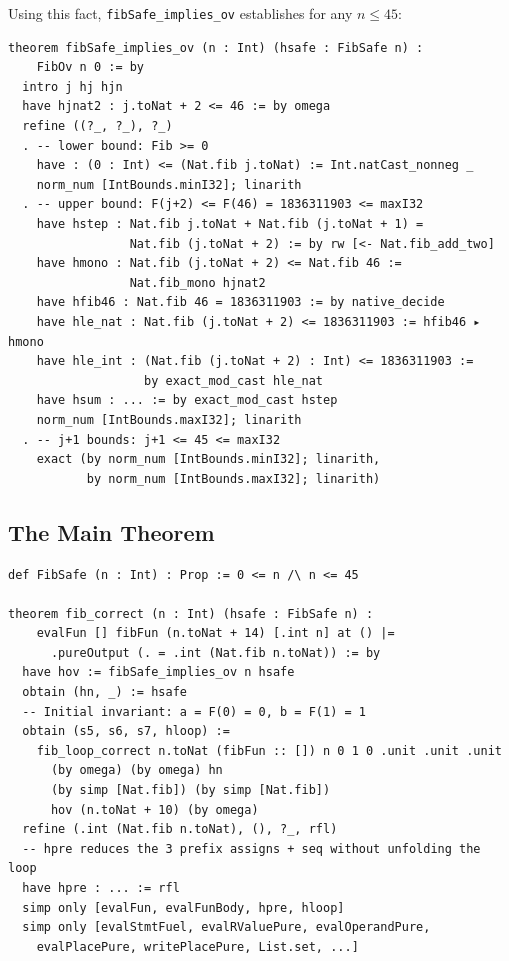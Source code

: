 Using this fact, \texttt{fibSafe\_implies\_ov} establishes \FibOv for any
$n \le 45$:

\begin{lstlisting}[caption={fibSafe\_implies\_ov proof structure.},label={lst:fibsafeov}]
theorem fibSafe_implies_ov (n : Int) (hsafe : FibSafe n) :
    FibOv n 0 := by
  intro j hj hjn
  have hjnat2 : j.toNat + 2 <= 46 := by omega
  refine ((?_, ?_), ?_)
  . -- lower bound: Fib >= 0
    have : (0 : Int) <= (Nat.fib j.toNat) := Int.natCast_nonneg _
    norm_num [IntBounds.minI32]; linarith
  . -- upper bound: F(j+2) <= F(46) = 1836311903 <= maxI32
    have hstep : Nat.fib j.toNat + Nat.fib (j.toNat + 1) =
                 Nat.fib (j.toNat + 2) := by rw [<- Nat.fib_add_two]
    have hmono : Nat.fib (j.toNat + 2) <= Nat.fib 46 :=
                 Nat.fib_mono hjnat2
    have hfib46 : Nat.fib 46 = 1836311903 := by native_decide
    have hle_nat : Nat.fib (j.toNat + 2) <= 1836311903 := hfib46 ▸ hmono
    have hle_int : (Nat.fib (j.toNat + 2) : Int) <= 1836311903 :=
                   by exact_mod_cast hle_nat
    have hsum : ... := by exact_mod_cast hstep
    norm_num [IntBounds.maxI32]; linarith
  . -- j+1 bounds: j+1 <= 45 <= maxI32
    exact (by norm_num [IntBounds.minI32]; linarith,
           by norm_num [IntBounds.maxI32]; linarith)
\end{lstlisting}

\subsection{The Main Theorem}

\begin{lstlisting}[caption={fib\_correct: the main theorem.},label={lst:fibcorrect}]
def FibSafe (n : Int) : Prop := 0 <= n /\ n <= 45

theorem fib_correct (n : Int) (hsafe : FibSafe n) :
    evalFun [] fibFun (n.toNat + 14) [.int n] at () |=
      .pureOutput (. = .int (Nat.fib n.toNat)) := by
  have hov := fibSafe_implies_ov n hsafe
  obtain (hn, _) := hsafe
  -- Initial invariant: a = F(0) = 0, b = F(1) = 1
  obtain (s5, s6, s7, hloop) :=
    fib_loop_correct n.toNat (fibFun :: []) n 0 1 0 .unit .unit .unit
      (by omega) (by omega) hn
      (by simp [Nat.fib]) (by simp [Nat.fib])
      hov (n.toNat + 10) (by omega)
  refine (.int (Nat.fib n.toNat), (), ?_, rfl)
  -- hpre reduces the 3 prefix assigns + seq without unfolding the loop
  have hpre : ... := rfl
  simp only [evalFun, evalFunBody, hpre, hloop]
  simp only [evalStmtFuel, evalRValuePure, evalOperandPure,
    evalPlacePure, writePlacePure, List.set, ...]
\end{lstlisting}

